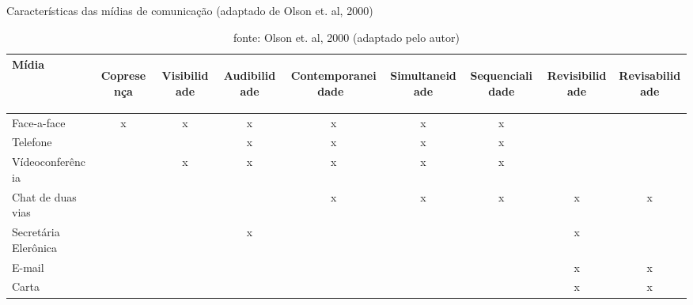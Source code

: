 
\begin{table}[]
\centering
\caption{Características das mídias de comunicação (adaptado de Olson et. al, 2000)}
\label{my-label}
\begin{tabular}{l|c|c|c|c|c|c|c|c}
\hline
Mídia                & \begin{turn}{90}Copresença\end{turn} &\begin{turn}{90} Visibilidade\end{turn} & \begin{turn}{90}Audibilidade\end{turn} & \begin{turn}{90}Contemporaneidade \, \end{turn} & \begin{turn}{90}Simultaneidade\end{turn} & \begin{turn}{90}Sequencialidade\end{turn} &\begin{turn}{90}Revisibilidade\end{turn} & \begin{turn}{90}Revisabilidade\end{turn} \\ \hline
Face-a-face          &   x     &      x        &    x          &          x        &        x        &         x    &                &                \\ \hline
Telefone             &           &       &     x         &           x        &         x       &         x        &                &                \\ \hline
Vídeoconferência     &        &       x   &          x    &       x            &         x       &       x          &                &                \\ \hline
Chat de duas vias    &                                 &                                   &              &           x        &          x      &        x         &        x        &          x      \\ \hline
Secretária Elerônica &                                 &                                   &     x         &                   &                &                 &        x        &                \\ \hline
E-mail               &                                 &                                   &              &                   &                &                 &      x          &     x           \\ \hline
Carta                &                                 &                                   &              &                   &                &                 &       x         &       x         \\ \hline
\end{tabular}
\caption*{fonte: Olson et. al, 2000 (adaptado pelo autor)}
\end{table}

